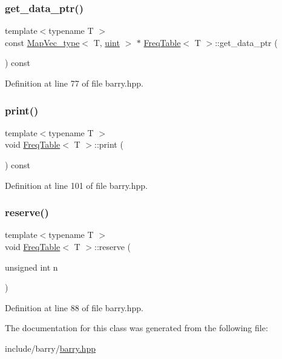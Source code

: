 \subsubsection{\texorpdfstring{get\+\_\+data\+\_\+ptr()}{get\_data\_ptr()}}
{\footnotesize\ttfamily template$<$typename T $>$ \\
const \hyperlink{namespacebarry_a2f0d3aab1d67e4c8eaeab9022e16139f}{Map\+Vec\+\_\+type}$<$ T, \hyperlink{namespacebarry_a11dfc53ddb4672278319aa04f1e09a6c}{uint} $>$ $\ast$ \hyperlink{classbarry_1_1_freq_table}{Freq\+Table}$<$ T $>$\+::get\+\_\+data\+\_\+ptr (\begin{DoxyParamCaption}{ }\end{DoxyParamCaption}) const\hspace{0.3cm}{\ttfamily [inline]}}



Definition at line 77 of file barry.\+hpp.

\mbox{\label{classbarry_1_1_freq_table_a4fe8f5e3b5bf64a1cbaf99deb96298d4}} 
\subsubsection{\texorpdfstring{print()}{print()}}
{\footnotesize\ttfamily template$<$typename T $>$ \\
void \hyperlink{classbarry_1_1_freq_table}{Freq\+Table}$<$ T $>$\+::print (\begin{DoxyParamCaption}{ }\end{DoxyParamCaption}) const\hspace{0.3cm}{\ttfamily [inline]}}



Definition at line 101 of file barry.\+hpp.

\mbox{\label{classbarry_1_1_freq_table_a0bdced25f7c0bee38e073c4654578d19}} 
\subsubsection{\texorpdfstring{reserve()}{reserve()}}
{\footnotesize\ttfamily template$<$typename T $>$ \\
void \hyperlink{classbarry_1_1_freq_table}{Freq\+Table}$<$ T $>$\+::reserve (\begin{DoxyParamCaption}\item[{unsigned int}]{n }\end{DoxyParamCaption})\hspace{0.3cm}{\ttfamily [inline]}}



Definition at line 88 of file barry.\+hpp.



The documentation for this class was generated from the following file\+:\begin{DoxyCompactItemize}
\item 
include/barry/\hyperlink{barry_8hpp}{barry.\+hpp}\end{DoxyCompactItemize}
